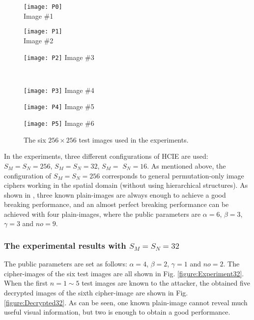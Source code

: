 \documentclass[final,3p,times,twocolumn]{elsarticle}
\newlength\figwidth
\newlength\sfigwidth
\newlength\vfigskip
\begin{document}
\begin{figure}[!htb]
\centering
\begin{minipage}{\sfigwidth}
\centering
\texttt{[image: P0]}\\
Image \#1
\end{minipage}
\begin{minipage}{\sfigwidth}
\centering
\texttt{[image: P1]}\\
Image \#2
\end{minipage}
\begin{minipage}{\sfigwidth}
\centering
\texttt{[image: P2]}
Image \#3
\end{minipage}\\[\vfigskip]
\begin{minipage}{\sfigwidth}
\centering
\texttt{[image: P3]}
Image \#4
\end{minipage}
\begin{minipage}{\sfigwidth}
\centering
\texttt{[image: P4]}
Image \#5
\end{minipage}
\begin{minipage}{\sfigwidth}
\centering
\texttt{[image: P5]}
Image \#6
\end{minipage}
\caption{The six $256\times 256$ test images used in the
experiments.} \label{figure:6TestImages}
\end{figure}

In the experiments, three different configurations of HCIE are
used: $S_M=S_N=256$, $S_M=S_N=32$, $S_M=$ $S_N=16$. As mentioned
above, the configuration of $S_M=S_N=256$ corresponds to general
permutation-only image ciphers working in the spatial domain
(without using hierarchical structures). As shown in \cite[Sec.~4]{Li:Permutation:SPIC2008}, three
known plain-images are always enough to achieve a good breaking
performance, and an almost perfect breaking performance can
be achieved with four plain-images, where the public parameters are $\alpha=6$, $\beta=3$, $\gamma=3$ and
$no=9$.

\subsubsection{The experimental results with $S_M=S_N=32$}

The public parameters are set as follows: $\alpha=4$, $\beta=2$, $\gamma=1$ and
$no=2$. The cipher-images of the six test images are all shown in
Fig. \ref{figure:Experiment32}. When the first $n=1\sim 5$ test
images are known to the attacker, the obtained five decrypted images of the
sixth cipher-image are shown in Fig. \ref{figure:Decrypted32}. As
can be seen, one known plain-image cannot reveal much useful
visual information, but two is enough to obtain a good
performance.
\end{document}
